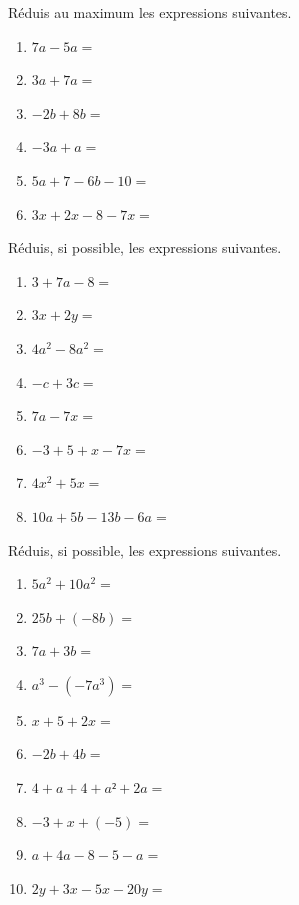 \documentclass[../../syllabus_1.tex]{subfiles}
\begin{document}
\begin{exercise}
    Réduis au maximum les expressions suivantes.
    \begin{enumerate}[cols=3, itemsep=1cm]
        \item \(7a - 5a =\)
        \item \(3a + 7a =\)
        \item \(- 2b + 8b =\)
        \item \(- 3a + a =\)
        \item \(5a + 7 - 6b - 10 =\)
        \item \(3x + 2x - 8 - 7x =\)
    \end{enumerate}
\end{exercise}

\newpage
\begin{exercise}
    Réduis, si possible, les expressions suivantes.
    \begin{enumerate}[cols=2, itemsep=1cm]
        \item \(3 + 7a - 8 =\)
        \item \(3x + 2y =\)
        \item \(4a^{2} - 8a^{2} =\)
        \item \(- c + 3c =\)
        \item \(7a - 7x =\)
        \item \(- 3 + 5 + x - 7x =\)
        \item \(4x^{2} + 5x =\)
        \item \(10a + 5b - 13b - 6a =\)
    \end{enumerate}
\end{exercise}

\begin{exercise}
    Réduis, si possible, les expressions suivantes.
    \begin{enumerate}[cols=2, itemsep=1cm]
        \item \(5a^{2} + 10a^{2} =\)
        \item \(25b + ( - 8b) =\)
        \item \(7a + 3b =\)
        \item \(a^{3} - ( - 7a^{3}) =\)
        \item \(x + 5 + 2x =\)
        \item \(- 2b + 4b =\)
        \item \(4 + a + 4 + a² + 2a =\)
        \item \(- 3 + x + ( - 5) =\)
        \item \(a + 4a - 8 - 5 - a =\)
        \item \(2y+3x-5x-20y=\)
    \end{enumerate}
\end{exercise}
\end{document}
